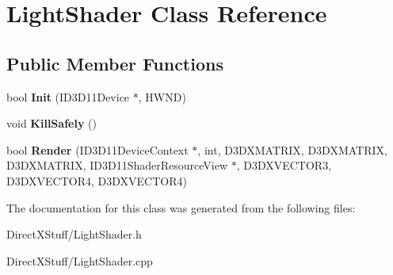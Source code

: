 \hypertarget{class_light_shader}{\section{Light\-Shader Class Reference}
\label{class_light_shader}
}
\subsection*{Public Member Functions}
\begin{DoxyCompactItemize}
\item 
\hypertarget{class_light_shader_a0239f7ebae3bed66ef62a72aaa981f25}{bool {\bfseries Init} (I\-D3\-D11\-Device $\ast$, H\-W\-N\-D)}\label{class_light_shader_a0239f7ebae3bed66ef62a72aaa981f25}

\item 
\hypertarget{class_light_shader_a59fca88c5389a2461a104ae60ee25350}{void {\bfseries Kill\-Safely} ()}\label{class_light_shader_a59fca88c5389a2461a104ae60ee25350}

\item 
\hypertarget{class_light_shader_ac167ce32fdc325b003b2eb9070d9381b}{bool {\bfseries Render} (I\-D3\-D11\-Device\-Context $\ast$, int, D3\-D\-X\-M\-A\-T\-R\-I\-X, D3\-D\-X\-M\-A\-T\-R\-I\-X, D3\-D\-X\-M\-A\-T\-R\-I\-X, I\-D3\-D11\-Shader\-Resource\-View $\ast$, D3\-D\-X\-V\-E\-C\-T\-O\-R3, D3\-D\-X\-V\-E\-C\-T\-O\-R4, D3\-D\-X\-V\-E\-C\-T\-O\-R4)}\label{class_light_shader_ac167ce32fdc325b003b2eb9070d9381b}

\end{DoxyCompactItemize}


The documentation for this class was generated from the following files\-:\begin{DoxyCompactItemize}
\item 
Direct\-X\-Stuff/Light\-Shader.\-h\item 
Direct\-X\-Stuff/Light\-Shader.\-cpp\end{DoxyCompactItemize}
